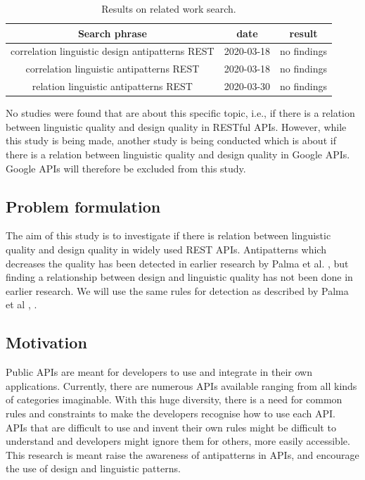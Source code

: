 \documentclass[a4paper,12pt]{article}
\begin{document}
\begin{table}[!ht]
\begin{center}
\begin{tabular}{| c | c | c |}
\hline \textbf{Search phrase} & \textbf{date} & \textbf{result} \\
\hline 
correlation linguistic design antipatterns REST &
2020-03-18 & 
no findings
\\ \hline
correlation linguistic antipatterns REST &
2020-03-18 &
no findings
\\ \hline
relation linguistic antipatterns REST &
2020-03-30 & 
no findings
\\ \hline
\end{tabular}
    \caption{Results on related work search.}
    \label{tab:Result of related work search}
\end{center}
\end{table}


\clearpage

No studies were found that are about this specific topic, i.e., if there is a relation between linguistic quality and design quality in RESTful APIs. However, while this study is being made, another study is being conducted which is about if there is a relation between linguistic quality and design quality in Google APIs. Google APIs will therefore be excluded from this study.

\subsection{Problem formulation}
The aim of this study is to investigate if there is relation between  linguistic quality and design quality in widely used REST APIs. Antipatterns which decreases the quality has been detected in earlier research by Palma et al. \cite{linguistic}, \cite{design} but finding a relationship between design and linguistic quality has not been done in earlier research. We will use the same rules for detection as described by Palma et al \cite{linguistic}, \cite{design}.


\subsection{Motivation}
Public APIs are meant for developers to use and integrate in their own applications. Currently, there are numerous APIs available ranging from all kinds of categories imaginable. With this huge diversity, there is a need for common rules and constraints to make the developers recognise how to use each API. APIs that are difficult to use and invent their own rules might be difficult to understand and developers might ignore them for others, more easily accessible. This research is meant raise the awareness of antipatterns in APIs, and encourage the use of design and linguistic patterns. 
\end{document}
